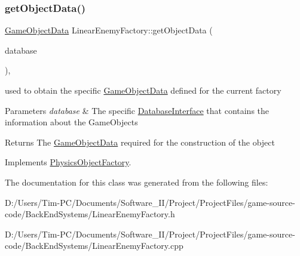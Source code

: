 \mbox{\label{class_linear_enemy_factory_a9d959b8a414e30ad4813d5d3740eafee}} 
\subsubsection{\texorpdfstring{get\+Object\+Data()}{getObjectData()}}
{\footnotesize\ttfamily \hyperlink{struct_game_object_data}{Game\+Object\+Data} Linear\+Enemy\+Factory\+::get\+Object\+Data (\begin{DoxyParamCaption}\item[{const std\+::shared\+\_\+ptr$<$ \hyperlink{class_database_interface}{Database\+Interface} $>$ \&}]{database }\end{DoxyParamCaption})\hspace{0.3cm}{\ttfamily [override]}, {\ttfamily [virtual]}}



used to obtain the specific \hyperlink{struct_game_object_data}{Game\+Object\+Data} defined for the current factory 


\begin{DoxyParams}{Parameters}
{\em database} & The specific \hyperlink{class_database_interface}{Database\+Interface} that contains the information about the Game\+Objects \\
\hline
\end{DoxyParams}
\begin{DoxyReturn}{Returns}
The \hyperlink{struct_game_object_data}{Game\+Object\+Data} required for the construction of the object 
\end{DoxyReturn}


Implements \hyperlink{class_physics_object_factory_aa59f52d3adc1fac676f4a8a3c2de9ba9}{Physics\+Object\+Factory}.



The documentation for this class was generated from the following files\+:\begin{DoxyCompactItemize}
\item 
D\+:/\+Users/\+Tim-\/\+P\+C/\+Documents/\+Software\+\_\+\+I\+I/\+Project/\+Project\+Files/game-\/source-\/code/\+Back\+End\+Systems/Linear\+Enemy\+Factory.\+h\item 
D\+:/\+Users/\+Tim-\/\+P\+C/\+Documents/\+Software\+\_\+\+I\+I/\+Project/\+Project\+Files/game-\/source-\/code/\+Back\+End\+Systems/Linear\+Enemy\+Factory.\+cpp\end{DoxyCompactItemize}
